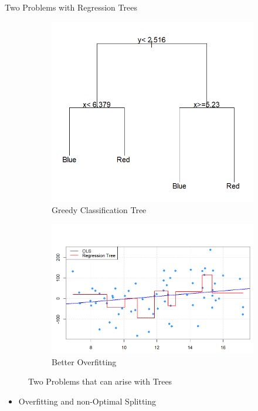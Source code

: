 \documentclass[10pt]{beamer}
\begin{document}
\begin{frame}{Two Problems with Regression Trees}
    \begin{figure}
        \centering
        \begin{subfigure}{.45\textwidth}
            \centering
            \includegraphics[width=1\linewidth]{Greedy Classification Tree.png}
            \caption{Greedy Classification Tree}
            \label{fig:sub7}  %
        \end{subfigure}%
        \begin{subfigure}{.45\textwidth}
            \centering
            \includegraphics[width=1\linewidth]{Better overfitting.png}
            \caption{Better Overfitting}
            \label{fig:sub8}  %
        \end{subfigure}
        \caption{Two Problems that can arise with Trees}
        \label{fig:sub9}  %
    \end{figure}
    \begin{itemize}
        \item Overfitting and non-Optimal Splitting
    \end{itemize}
\end{frame}
\end{document}

